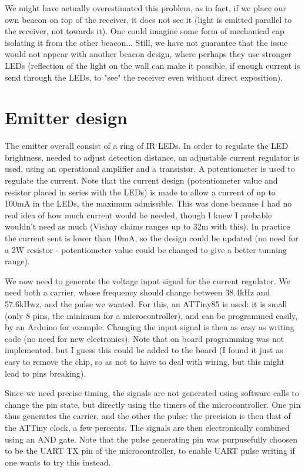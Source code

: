 \documentclass[a4paper,11pt]{article}
\begin{document}
 We might have actually overestimated this problem, as in fact, if we place our own beacon on top of the receiver, it does not see it (light is emitted parallel to the receiver, not towards it). One could imagine some form of mechanical cap isolating it from the other beacon... Still, we have not guarantee that the issue would not appear with another beacon design, where perhaps they use stronger LEDs (reflection of the light on the wall can make it possible, if enough current is send through the LEDs, to "see" the receiver even without direct exposition). 

\section{Emitter design}

The emitter overall consist of a ring of IR LEDs. In order to regulate the LED brightness, needed to adjust detection distance, an adjustable current regulator is used, using an operational amplifier and a transistor. A potentiometer is used to regulate the current. Note that the current design (potentiometer value and resistor placed in series with the LEDs) is made to allow a current of up to 100mA in the LEDs, the maximum admissible. This was done because I had no real idea of how much current would be needed, though I knew I probable wouldn't need as much (Vishay claims ranges up to 32m with this). In practice the current sent is lower than 10mA, so the design could be updated (no need for a 2W resistor - potentiometer value could be changed to give a better tunning range).

We now need to generate the voltage input signal for the current regulator. We need both a carrier, whose frequency should change between 38.4kHz and 57.6kHwz, and the pulse we wanted. For this, an ATTiny85 is used: it is small (only 8 pins, the minimum for a microcontroller), and can be programmed easily, by an Arduino for example. Changing the input signal is then as easy as writing code (no need for new electronics). Note that on board programming was not implemented, but I guess this could be added to the board (I found it just as easy to remove the chip, so as not to have to deal with wiring, but this might lead to pins breaking).

Since we need precise timing, the signals are not generated using software calls to change the pin state, but directly using the timers of the microcontroller. One pin thus generates the carrier, and the other the pulse: the precision is then that of the ATTiny clock, a few percents. The signals are then electronically combined using an AND gate. Note that the pulse generating pin was purpusefully choosen to be the UART TX pin of the microcontroller, to enable UART pulse writing if one wants to try this instead.
\end{document}
